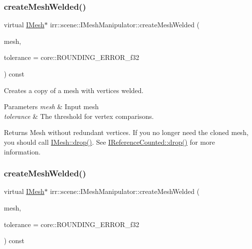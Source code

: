 \subsubsection{\texorpdfstring{create\+Mesh\+Welded()}{createMeshWelded()}\hspace{0.1cm}{\footnotesize\ttfamily [1/2]}}
{\footnotesize\ttfamily virtual \hyperlink{classirr_1_1scene_1_1IMesh}{I\+Mesh}$\ast$ irr\+::scene\+::\+I\+Mesh\+Manipulator\+::create\+Mesh\+Welded (\begin{DoxyParamCaption}\item[{\hyperlink{classirr_1_1scene_1_1IMesh}{I\+Mesh} $\ast$}]{mesh,  }\item[{\hyperlink{namespaceirr_a0277be98d67dc26ff93b1a6a1d086b07}{f32}}]{tolerance = {\ttfamily core\+:\+:ROUNDING\+\_\+ERROR\+\_\+f32} }\end{DoxyParamCaption}) const\hspace{0.3cm}{\ttfamily [pure virtual]}}



Creates a copy of a mesh with vertices welded. 


\begin{DoxyParams}{Parameters}
{\em mesh} & Input mesh \\
\hline
{\em tolerance} & The threshold for vertex comparisons. \\
\hline
\end{DoxyParams}
\begin{DoxyReturn}{Returns}
Mesh without redundant vertices. If you no longer need the cloned mesh, you should call \hyperlink{classirr_1_1IReferenceCounted_a03856a09355b89d178090c4a5f738543}{I\+Mesh\+::drop()}. See \hyperlink{classirr_1_1IReferenceCounted_a03856a09355b89d178090c4a5f738543}{I\+Reference\+Counted\+::drop()} for more information. 
\end{DoxyReturn}
\mbox{\label{classirr_1_1scene_1_1IMeshManipulator_ac19065037302c0500cb6ebecefcc6c6d}} 
\subsubsection{\texorpdfstring{create\+Mesh\+Welded()}{createMeshWelded()}\hspace{0.1cm}{\footnotesize\ttfamily [2/2]}}
{\footnotesize\ttfamily virtual \hyperlink{classirr_1_1scene_1_1IMesh}{I\+Mesh}$\ast$ irr\+::scene\+::\+I\+Mesh\+Manipulator\+::create\+Mesh\+Welded (\begin{DoxyParamCaption}\item[{\hyperlink{classirr_1_1scene_1_1IMesh}{I\+Mesh} $\ast$}]{mesh,  }\item[{\hyperlink{namespaceirr_a0277be98d67dc26ff93b1a6a1d086b07}{f32}}]{tolerance = {\ttfamily core\+:\+:ROUNDING\+\_\+ERROR\+\_\+f32} }\end{DoxyParamCaption}) const\hspace{0.3cm}{\ttfamily [pure virtual]}}



